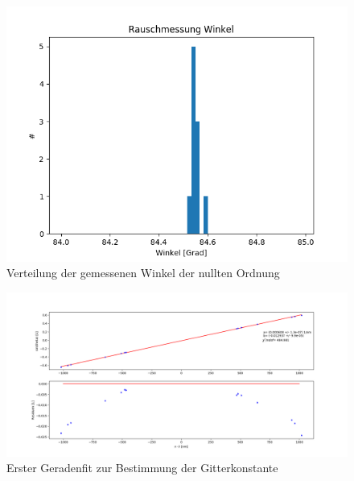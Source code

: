 \documentclass[12pt,a4paper]{article}
\begin{document}
\begin{figure}
\begin{center}
\includegraphics[scale=0.7]{Bilder/Rauschmessung_Winkelmessung_Nullte_Ordnung.png}
\end{center}
\caption[Rauschmessung Winkelmessung]{Verteilung der gemessenen Winkel der nullten Ordnung}
\label{fig:Rauschmessung_Winkel_Gitter}
\end{figure}

\begin{figure}
\begin{center}
\includegraphics[scale=0.4]{Bilder/First_Fit_Gitterkonstante.png}
\end{center}
\caption[Erster Fit Gitterkonstante]{Erster Geradenfit zur Bestimmung der Gitterkonstante}
\label{fig:FirstFit_Gitterkonstante}
\end{figure}
\end{document}
